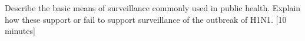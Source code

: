 Describe the basic means of surveillance commonly used in public health.  Explain how these support or fail to support surveillance of the outbreak of H1N1. [10 minutes]

\TextEntry[itemname=dtk103]